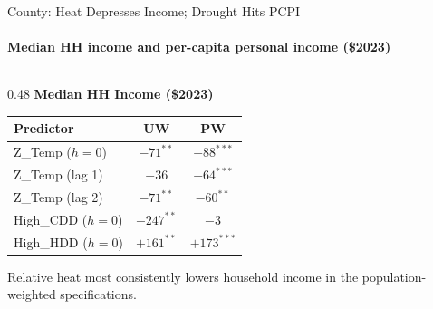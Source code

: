 \documentclass[aspectratio=169,11pt]{beamer}
\newcommand{\emphcolor}[1]{{\color{WarmOrange}\textbf{#1}}}
\newcommand{\tealtext}[1]{{\color{Teal}#1}}
\newcommand{\graytext}[1]{{\color{WarmGray}#1}}
\begin{document}
\begin{frame}[shrink=12]{County: Heat Depresses Income; Drought Hits PCPI}
  \framesubtitle{Median HH income and per-capita personal income (\$2023)}
  \small
  \begin{columns}[T]
    \begin{column}{0.48\textwidth}
      \tealtext{\textbf{Median HH Income (\$2023)}}\\[0.25em]
      \begin{tabular}{lcc}
        \toprule
        Predictor & UW & PW \\
        \midrule
        Z\_Temp ($h{=}0$)   & \emphcolor{$-71^{**}$}  & \emphcolor{$-88^{***}$} \\
        Z\_Temp (lag 1)     & $-36$  & \emphcolor{$-64^{***}$} \\
        Z\_Temp (lag 2)     & \emphcolor{$-71^{**}$}  & \emphcolor{$-60^{**}$}  \\
        High\_CDD ($h{=}0$) & \emphcolor{$-247^{**}$} & $-3$   \\
        High\_HDD ($h{=}0$) & $+161^{**}$ & \emphcolor{$+173^{***}$} \\
        \bottomrule
      \end{tabular}
      \vspace{0.25em}
      \graytext{\scriptsize Relative heat most consistently lowers household income in the population-weighted specifications.}


\end{column}
\end{columns}
\end{frame}
\end{document}

